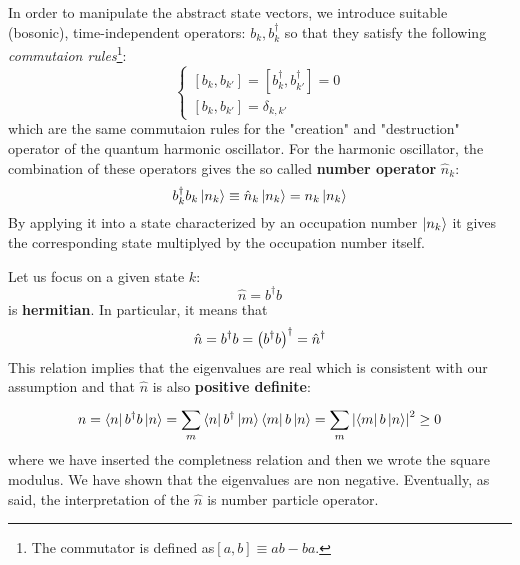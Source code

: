 \documentclass[../main/main.tex]{subfiles}
\begin{document}
In order to manipulate the abstract state vectors,   we introduce suitable (bosonic), time-independent operators: \( b_k,b_k^\dag \) so that they satisfy the following \emph{commutaion rules}\footnote{The commutator is defined as\( [a,b]\equiv ab - ba \).}:
\begin{equation}
  \begin{cases}
   [b_k,b_{k'}]= [b_k^\dag,b_{k'}^\dag] = 0\\
   [b_k,b_{k'}]= \delta _{k,k'}
  \end{cases}
\end{equation}
which are the same commutaion rules for the "creation" and "destruction" operator of the quantum harmonic oscillator. For the harmonic oscillator, the combination of these operators gives the so called \textbf{ number operator} \( \hat{n}_k  \):  
\begin{equation}
  b_k^\dag b_k \ket{n_k} \equiv \hat{n}_k \ket{n_k} = n_k \ket{n_k}
\end{equation}
By applying it into a state characterized by an occupation number \( \ket{n_k}  \) it gives the corresponding state multiplyed by the occupation number itself.

Let us focus on a given state \( k \):
\begin{equation*}
  \hat{n} = b^\dag b
\end{equation*}
is \textbf{hermitian}. In particular, it means that
\begin{equation*}
  \hat{n} = b^\dag b = \qty(b^\dag b)^\dag = \hat{n}^\dag
\end{equation*}
This relation implies that the eigenvalues are real which is consistent with our assumption and that \( \hat{n}  \) is also \textbf{positive definite}:
\begin{equation*}
  n = \bra{n} b^\dag b \ket{n} = \sum_{m}^{} \bra{n} b^\dag \ket{m} \bra{m} b \ket{n} = \sum_{m}^{} \abs{\bra{m} b \ket{n}  }^2 \ge 0
\end{equation*}
where we have inserted the completness relation and then we wrote the square modulus. We have shown that the eigenvalues are non negative.
Eventually, as said, the interpretation of the \( \hat{n}  \) is number particle operator.
\end{document}
